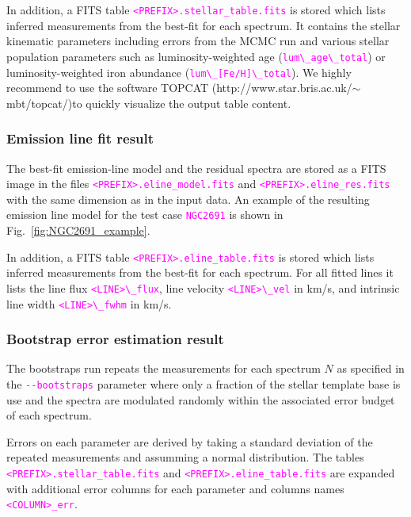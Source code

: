 \documentclass[usenatbib,usegraphicx,useAMS,onecolumn]{mn2e}
\newcommand{\codeline}[1]{\lstinline|#1|}
\newcommand{\fname}[1]{\textcolor{magenta}{\codeline{#1}}}
\begin{document}
In addition, a FITS table \fname{<PREFIX>.stellar_table.fits} is stored which lists inferred measurements from the best-fit for each spectrum. It contains the stellar kinematic parameters including errors from the MCMC run and various stellar population parameters such as luminosity-weighted age (\fname{lum\_age\_total}) or luminosity-weighted iron abundance (\fname{lum\_[Fe/H]\_total}). We highly recommend to use the software \textsc{TOPCAT} (http://www.star.bris.ac.uk/$\sim$mbt/topcat/)to quickly visualize the output table content. 

\subsubsection{Emission line fit result}
The best-fit emission-line model and the residual spectra are stored as a FITS image in the files \fname{<PREFIX>.eline_model.fits} and \fname{<PREFIX>.eline_res.fits} with the same dimension as in the input data. An example of the resulting emission line model for the test case \fname{NGC2691} is shown in Fig.~\ref{fig:NGC2691_example}. 

In addition, a FITS table \fname{<PREFIX>.eline_table.fits} is stored which lists inferred measurements from the best-fit for each spectrum. For all fitted lines it lists the  line flux \fname{<LINE>\_flux}, line velocity \fname{<LINE>\_vel} in km/s, and intrinsic line width \fname{<LINE>\_fwhm} in km/s. 

\subsubsection{Bootstrap error estimation result}
The bootstraps run repeats the measurements for each spectrum $N$ as specified in the \fname{--bootstraps} parameter where only a fraction of the stellar template base is use and the spectra are modulated randomly within the associated error budget of each spectrum. 

Errors on each parameter are derived by taking a standard deviation of the repeated measurements and assumming a normal distribution. The tables \fname{<PREFIX>.stellar_table.fits} and \fname{<PREFIX>.eline_table.fits} are expanded with additional error columns for each parameter and columns names \fname{<COLUMN>_err}. 
\end{document}
